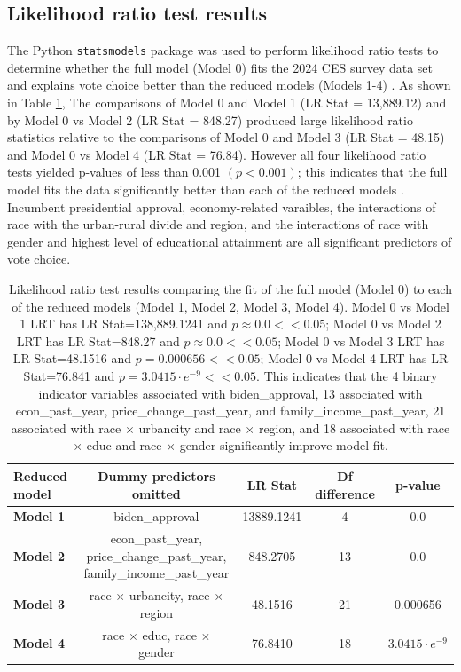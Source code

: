 \documentclass[letter]{article}
\begin{document}
\subsection{Likelihood ratio test results}\label{sec-lrt}
The Python \texttt{statsmodels} package was used to perform likelihood ratio tests to determine whether the full model (Model 0) fits the 2024 CES survey data set and explains vote choice better than the reduced models (Models 1-4) \cite{statsmodels} \cite{lrt-wikipedia}. As shown in Table \ref{tab:lrt}, The comparisons of Model 0 and Model 1 (LR Stat = 13,889.12) and by Model 0 vs Model 2 (LR Stat = 848.27) produced large likelihood ratio statistics relative to the comparisons of Model 0 and Model 3 (LR Stat = 48.15) and Model 0 vs Model 4 (LR Stat = 76.84). However all four likelihood ratio tests yielded p-values of less than 0.001 $(p < 0.001)$; this indicates that the full model fits the data significantly better than each of the reduced models \cite{ucla}. Incumbent presidential approval, economy-related varaibles, the interactions of race with the urban-rural divide and region, and the interactions of race with gender and highest level of educational attainment are all significant predictors of vote choice. 
\begin{table}[H]
\centering
\begin{tabular}{lcccc} \midrule
    \textbf{Reduced model} & \textbf{Dummy predictors omitted} &\textbf{ LR Stat} & \textbf{Df difference} & \textbf{p-value }\\ \midrule
     \textbf{Model 1} & biden\_approval & 13889.1241 & 4 & 0.0 \\ \hline
     \textbf{Model 2} & \makecell{econ\_past\_year, \\ price\_change\_past\_year, \\ family\_income\_past\_year} & 848.2705 & 13 & 0.0 \\ \hline
     \textbf{Model 3} & race $\times$ urbancity, race $\times$ region & 48.1516 & 21 & 0.000656 \\ \hline
     \textbf{Model 4} & race $\times$ educ, race $\times$ gender & 76.8410 & 18 & $3.0415 \cdot e^{-9}$\\ \midrule
\end{tabular} 
\caption{Likelihood ratio test results comparing the fit of the full model (Model 0) to each of the reduced models (Model 1, Model 2, Model 3, Model 4). Model 0 vs Model 1 LRT has LR Stat=138,889.1241 and $p \approx 0.0 << 0.05$; Model 0 vs Model 2 LRT has LR Stat=848.27 and $p \approx 0.0 << 0.05$; Model 0 vs Model 3 LRT has LR Stat=48.1516 and $p=0.000656 << 0.05$; Model 0 vs Model 4 LRT has LR Stat=76.841 and $p=3.0415\cdot e^{-9} << 0.05$. This indicates that the 4 binary indicator variables associated with biden\_approval, 13 associated with econ\_past\_year, price\_change\_past\_year, and family\_income\_past\_year, 21 associated with race $\times$ urbancity and race $\times$ region, and 18 associated with race $\times$ educ and race $\times$ gender significantly improve model fit.}
\label{tab:lrt}
\end{table}
\end{document}
